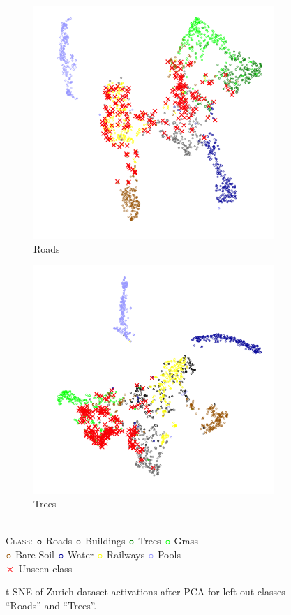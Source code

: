 \documentclass[10pt]{article}
\newcommand{\legendBullet}{
    \textsc{Class}: 
    ${\color{black}\boldsymbol{\circ}}$ Roads
    ${\color{buildings}\boldsymbol{\circ}}$ Buildings
    ${\color{trees}\boldsymbol{\circ}}$ Trees
    ${\color{grass}\boldsymbol{\circ}}$ Grass\\
    ${\color{baresoil}\boldsymbol{\circ}}$ Bare Soil
    ${\color{water}\boldsymbol{\circ}}$ Water
    ${\color{railways}\boldsymbol{\circ}}$ Railways
    ${\color{swimmingpools}\boldsymbol{\circ}}$ Pools\\
    ${\color{unseen}\boldsymbol{\times}}$ Unseen class
    }
\begin{document}
\begin{figure}[H]
    \centering
    \begin{subfigure}{.49\textwidth}
        \centering
        \includegraphics[width=\textwidth]{t-SNE_wo_cl1_after_PCA}
        \caption{Roads}
    \end{subfigure}
    \begin{subfigure}{.5\textwidth}
        \centering
        \includegraphics[width=\textwidth]{t-SNE_wo_cl3_after_PCA}
        \caption{Trees}
    \end{subfigure}
    \\[.2cm]
    \legendBullet
    \caption{\gls{t-SNE} of Zurich dataset activations after \gls{PCA} for left-out classes ``Roads'' and ``Trees''.}
    \label{fig:tsne-zurich-miscl}
\end{figure}
\end{document}
